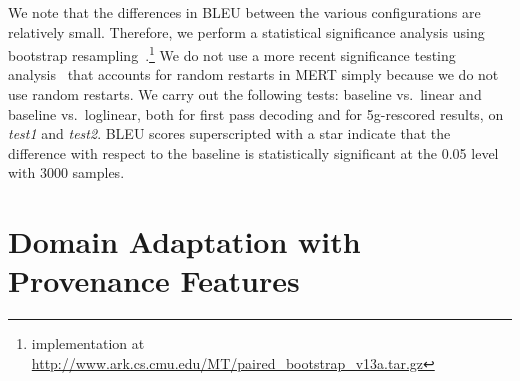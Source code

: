 We note that the differences in BLEU between the various configurations are
relatively small. Therefore, we perform a statistical significance analysis
using bootstrap resampling~\citep{koehn:2004:EMNLP}.\footnote{implementation at \url{http://www.ark.cs.cmu.edu/MT/paired_bootstrap_v13a.tar.gz}}
We do not use a more
recent significance testing analysis~\citep{clark-dyer-lavie-smith:2011:ACL} that
accounts for random restarts in MERT simply because we do not use
random restarts. %
We carry out the following tests: baseline vs.\ linear and baseline vs.\ loglinear, both
for first pass decoding and for 5g-rescored results, on \emph{test1} and \emph{test2}.
BLEU scores superscripted with a star indicate that the difference with respect to the
baseline is statistically significant at the 0.05 level with 3000 samples.


\section{Domain Adaptation with Provenance Features}
\label{sec:domainAdaptationGrammar}


